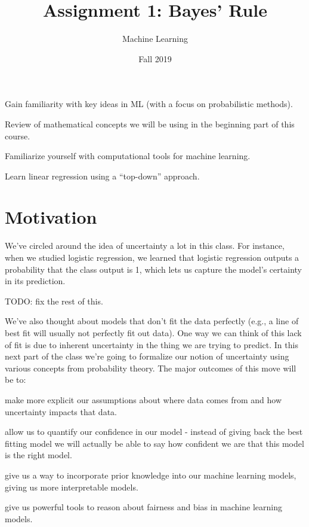 \documentclass[assignment01_Solutions]{subfiles}
\title{Assignment 1: Bayes' Rule}
\author{Machine Learning}
\date{Fall 2019}
\begin{document}
\maketitle
\thispagestyle{firstpage}


\begin{learningobjectives}
\bi
\item Gain familiarity with key ideas in ML (with a focus on probabilistic methods).
\item Review of mathematical concepts we will be using in the beginning part of this course.
\item Familiarize yourself with computational tools for machine learning.
\item Learn linear regression using a ``top-down'' approach.
\ei
\end{learningobjectives}

\section{Motivation}
We’ve circled around the idea of uncertainty a lot in this class.  For instance, when we studied logistic regression, we learned that logistic regression outputs a probability that the class output is 1, which lets us capture the model's certainty in its prediction.

TODO: fix the rest of this.

We’ve also thought about models that don’t fit the data perfectly (e.g., a line of best fit will usually not perfectly fit out data).  One way we can think of this lack of fit is due to inherent uncertainty in the thing we are trying to predict.  In this next part of the class we’re going to formalize our notion of uncertainty using various concepts from probability theory.  The major outcomes of this move will be to:

\bi
\item make more explicit our assumptions about where data comes from and how uncertainty impacts that data.
\item allow us to quantify our confidence in our model - instead of giving back the best fitting model we will actually be able to say how confident we are that this model is the right model.
\item give us a way to incorporate prior knowledge into our machine learning models, giving us more interpretable models.
\item give us powerful tools to reason about fairness and bias in machine learning models.
\ei
\end{document}
